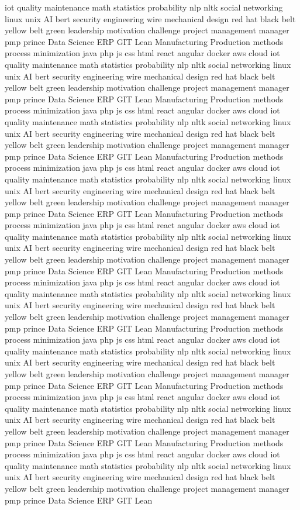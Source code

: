 \documentclass[letterpaper,11pt]{article}
\begin{document}
iot quality maintenance math statistics probability nlp nltk social networking linux unix AI bert security engineering wire mechanical design red hat black belt yellow belt green leadership motivation challenge project management manager pmp prince Data Science ERP GIT Lean Manufacturing Production methods process minimization java php js css html react angular docker aws cloud iot quality maintenance math statistics probability nlp nltk social networking linux unix AI bert security engineering wire mechanical design red hat black belt yellow belt green leadership motivation challenge project management manager pmp prince Data Science ERP GIT Lean Manufacturing Production methods process minimization java php js css html react angular docker aws cloud iot quality maintenance math statistics probability nlp nltk social networking linux unix AI bert security engineering wire mechanical design red hat black belt yellow belt green leadership motivation challenge project management manager pmp prince Data Science ERP GIT Lean Manufacturing Production methods process minimization java php js css html react angular docker aws cloud iot quality maintenance math statistics probability nlp nltk social networking linux unix AI bert security engineering wire mechanical design red hat black belt yellow belt green leadership motivation challenge project management manager pmp prince Data Science ERP GIT Lean Manufacturing Production methods process minimization java php js css html react angular docker aws cloud iot quality maintenance math statistics probability nlp nltk social networking linux unix AI bert security engineering wire mechanical design red hat black belt yellow belt green leadership motivation challenge project management manager pmp prince Data Science ERP GIT Lean Manufacturing Production methods process minimization java php js css html react angular docker aws cloud iot quality maintenance math statistics probability nlp nltk social networking linux unix AI bert security engineering wire mechanical design red hat black belt yellow belt green leadership motivation challenge project management manager pmp prince Data Science ERP GIT Lean Manufacturing Production methods process minimization java php js css html react angular docker aws cloud iot quality maintenance math statistics probability nlp nltk social networking linux unix AI bert security engineering wire mechanical design red hat black belt yellow belt green leadership motivation challenge project management manager pmp prince Data Science ERP GIT Lean Manufacturing Production methods process minimization java php js css html react angular docker aws cloud iot quality maintenance math statistics probability nlp nltk social networking linux unix AI bert security engineering wire mechanical design red hat black belt yellow belt green leadership motivation challenge project management manager pmp prince Data Science ERP GIT Lean Manufacturing Production methods process minimization java php js css html react angular docker aws cloud iot quality maintenance math statistics probability nlp nltk social networking linux unix AI bert security engineering wire mechanical design red hat black belt yellow belt green leadership motivation challenge project management manager pmp prince Data Science ERP GIT Lean 
\end{document}
